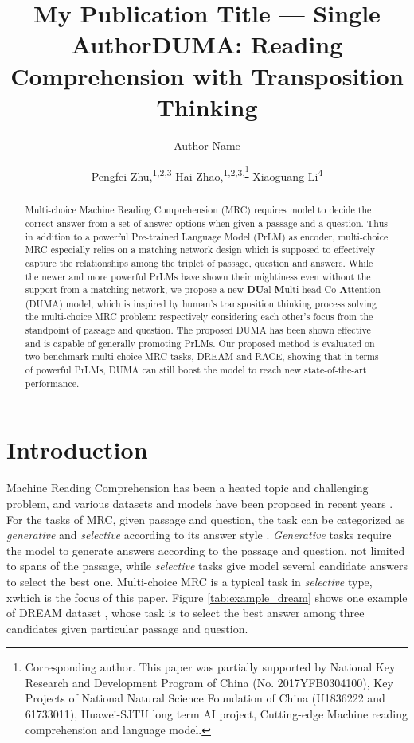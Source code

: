 \documentclass[letterpaper]{article} \usepackage{aaai21}  \usepackage{times}  \usepackage{helvet} \usepackage{courier}  \usepackage[hyphens]{url}  \usepackage{graphicx} \urlstyle{rm} \def\UrlFont{\rm}  \usepackage{natbib}  \usepackage{caption} \frenchspacing  \setlength{\pdfpagewidth}{8.5in}  \setlength{\pdfpageheight}{11in}
\title{My Publication Title --- Single Author}
\author {
Author Name \\
}
\title{DUMA: Reading Comprehension with Transposition Thinking }
\author {
Pengfei Zhu,\textsuperscript{\rm 1,2,3}
Hai Zhao,\textsuperscript{\rm 1,2,3,\footnote{Corresponding author. This paper was partially supported by National Key Research and Development Program of China (No. 2017YFB0304100), Key Projects of National Natural Science Foundation of China (U1836222 and 61733011), Huawei-SJTU long term AI project, Cutting-edge Machine reading comprehension and language model.}}
Xiaoguang Li\textsuperscript{\rm 4} \\
}
\begin{document}
\maketitle

\begin{abstract}
Multi-choice Machine Reading Comprehension (MRC) requires model to decide the correct answer from a set of answer options when given a passage and a question. Thus in addition to a powerful Pre-trained Language Model (PrLM) as encoder, multi-choice MRC especially relies on a matching network design which is supposed to effectively capture the relationships among the triplet of passage, question and answers. While the newer and more powerful PrLMs have shown their mightiness even without the support from a matching network, we propose a new \textbf{DU}al \textbf{M}ulti-head Co-\textbf{A}ttention (DUMA) model, which is inspired by human's transposition thinking process solving the multi-choice MRC problem: respectively considering each other's focus from the standpoint of passage and question. The proposed DUMA has been shown effective and is capable of generally promoting PrLMs. Our proposed method is evaluated on two benchmark multi-choice MRC tasks, DREAM and RACE, showing that in terms of powerful PrLMs, DUMA can still boost the model to reach new state-of-the-art performance.

\end{abstract}

\section{Introduction}
Machine Reading Comprehension has been a heated topic and challenging problem, and various datasets and models have been proposed in recent years \cite{newsqa,ecawe,msmarco,squad,teach_machine_read,dream,race,dua,lingke,zhang2020sg,bhargav2020translucent,hu2019read+}. For the tasks of MRC, given passage and question, the task can be categorized as \textit{generative} and \textit{selective} according to its answer style \cite{mrc_survey}. \textit{Generative} tasks require the model to generate answers according to the passage and question, not limited to spans of the passage, while \textit{selective} tasks give model several candidate answers to select the best one. Multi-choice MRC is a typical task in \textit{selective} type, xwhich is the focus of this paper. Figure \ref{tab:example_dream} shows one example of DREAM dataset \cite{dream}, whose task is to select the best answer among three candidates given particular passage and question. 
\end{document}
